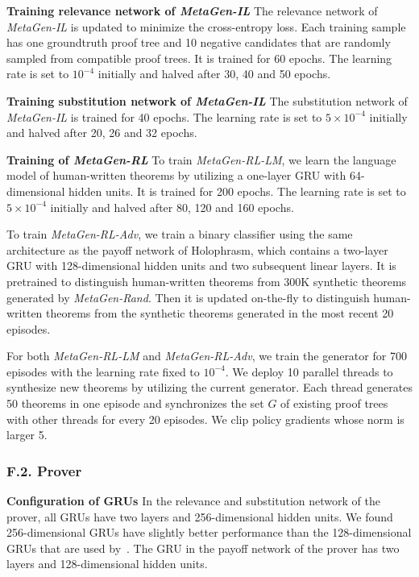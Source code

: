 \documentclass{article}
\begin{document}
\noindent\textbf{Training relevance network of \emph{MetaGen-IL}}
The relevance network of \emph{MetaGen-IL} is updated to minimize the cross-entropy loss. Each training sample has one groundtruth proof tree and 10 negative candidates that are randomly sampled
from compatible proof trees.
It is trained for 60 epochs.
The learning rate is set to $10^{-4}$ initially and halved
after 30, 40 and 50 epochs. 

\noindent\textbf{Training substitution network of \emph{MetaGen-IL}} The substitution network of \emph{MetaGen-IL} is trained for 40 epochs.
The learning rate is set to $5\times10^{-4}$ initially and halved 
after 20, 26 and 32 epochs. 

\noindent\textbf{Training of \emph{MetaGen-RL}}
To train \emph{MetaGen-RL-LM},
we learn the language model of human-written theorems 
by utilizing
a one-layer GRU with 64-dimensional hidden units. 
It is trained for 200 epochs.
The learning rate is set to $5\times10^{-4}$ initially and halved after 80, 120 and 160 epochs. 

To train \emph{MetaGen-RL-Adv}, 
we train a binary classifier using the same architecture 
as the payoff network of Holophrasm, 
which contains a two-layer GRU with 128-dimensional hidden units and two subsequent linear layers.
It is pretrained to distinguish human-written theorems from 300K synthetic theorems generated by \emph{MetaGen-Rand}.
Then it is updated on-the-fly to distinguish human-written theorems from the synthetic theorems generated in the most recent 20 episodes. 

For both \emph{MetaGen-RL-LM} and \emph{MetaGen-RL-Adv},
we train the generator 
for 700 episodes with the learning rate fixed to $10^{-4}$.
We deploy 10 parallel threads to synthesize new theorems by utilizing the current generator. Each thread generates 50 theorems 
in one episode and synchronizes the set $G$ of existing proof trees with other threads for every 20 episodes. 
We clip policy gradients whose norm is larger 5. 

\subsubsection*{F.2. Prover}
\label{app:prover}
\noindent\textbf{Configuration of GRUs}
In the relevance and substitution network of the prover, 
all GRUs have two layers and 256-dimensional hidden units.
We found 256-dimensional GRUs have slightly better performance than the 128-dimensional GRUs that are used by~\citet{whalen2016holophrasm}.
The GRU in the payoff network of the prover
has two layers and 128-dimensional hidden units.
\end{document}

